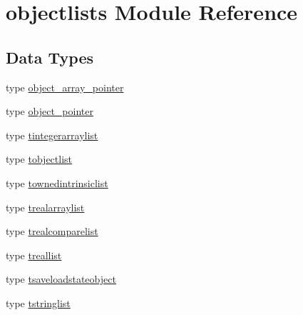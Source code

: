 \hypertarget{namespaceobjectlists}{}\section{objectlists Module Reference}
\label{namespaceobjectlists}
\subsection*{Data Types}
\begin{DoxyCompactItemize}
\item 
type \mbox{\hyperlink{structobjectlists_1_1object__array__pointer}{object\+\_\+array\+\_\+pointer}}
\item 
type \mbox{\hyperlink{structobjectlists_1_1object__pointer}{object\+\_\+pointer}}
\item 
type \mbox{\hyperlink{structobjectlists_1_1tintegerarraylist}{tintegerarraylist}}
\item 
type \mbox{\hyperlink{structobjectlists_1_1tobjectlist}{tobjectlist}}
\item 
type \mbox{\hyperlink{structobjectlists_1_1townedintrinsiclist}{townedintrinsiclist}}
\item 
type \mbox{\hyperlink{structobjectlists_1_1trealarraylist}{trealarraylist}}
\item 
type \mbox{\hyperlink{structobjectlists_1_1trealcomparelist}{trealcomparelist}}
\item 
type \mbox{\hyperlink{structobjectlists_1_1treallist}{treallist}}
\item 
type \mbox{\hyperlink{structobjectlists_1_1tsaveloadstateobject}{tsaveloadstateobject}}
\item 
type \mbox{\hyperlink{structobjectlists_1_1tstringlist}{tstringlist}}
\end{DoxyCompactItemize}

